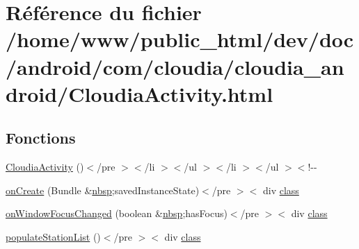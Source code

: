 \hypertarget{_cloudia_activity_8html}{\section{Référence du fichier /home/www/public\-\_\-html/dev/doc/android/com/cloudia/cloudia\-\_\-android/\-Cloudia\-Activity.html}
\label{_cloudia_activity_8html}
}
\subsection*{Fonctions}
\begin{DoxyCompactItemize}
\item 
\hyperlink{_cloudia_activity_8html_a4396ea8d2e5c770b7aab841594d3f67e}{Cloudia\-Activity} ()$<$/pre $>$$<$/li $>$$<$/ul $>$$<$/li $>$$<$/ul $>$$<$!-\/-\/
\item 
\hyperlink{_cloudia_activity_8html_aba0a51a46194045c19fd67aa9ed0dd44}{on\-Create} (Bundle \&\hyperlink{_tools_8html_aef915316f784c9063d942974538301a6}{nbsp};saved\-Instance\-State)$<$/pre $>$$<$ div \hyperlink{_tools_8html_acf06f836132665ba8114f5a414c2403f}{class}
\item 
\hyperlink{_cloudia_activity_8html_a534bf33681cddda7225e272346d33979}{on\-Window\-Focus\-Changed} (boolean \&\hyperlink{_tools_8html_aef915316f784c9063d942974538301a6}{nbsp};has\-Focus)$<$/pre $>$$<$ div \hyperlink{_tools_8html_acf06f836132665ba8114f5a414c2403f}{class}
\item 
\hyperlink{_cloudia_activity_8html_a9b06c8938bc8812ba4be667a7f7406d8}{populate\-Station\-List} ()$<$/pre $>$$<$ div \hyperlink{_tools_8html_acf06f836132665ba8114f5a414c2403f}{class}
\end{DoxyCompactItemize}

